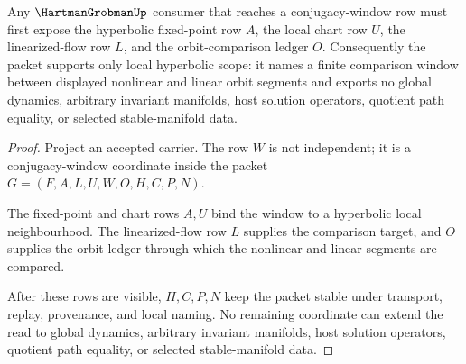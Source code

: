 \begin{theorem}
\label{thm:hartman-grobman-hyperbolic-scope}
Any $\HartmanGrobmanUp$ consumer that reaches a conjugacy-window row must first expose the hyperbolic fixed-point row $A$, the local chart row $U$, the linearized-flow row $L$, and the orbit-comparison ledger $O$. Consequently the packet supports only local hyperbolic scope: it names a finite comparison window between displayed nonlinear and linear orbit segments and exports no global dynamics, arbitrary invariant manifolds, host solution operators, quotient path equality, or selected stable-manifold data.
\end{theorem}
\begin{proof}
Project an accepted carrier. The row $W$ is not independent; it is a conjugacy-window coordinate inside the packet $G=(F,A,L,U,W,O,H,C,P,N)$.

The fixed-point and chart rows $A,U$ bind the window to a hyperbolic local neighbourhood. The linearized-flow row $L$ supplies the comparison target, and $O$ supplies the orbit ledger through which the nonlinear and linear segments are compared.

After these rows are visible, $H,C,P,N$ keep the packet stable under transport, replay, provenance, and local naming. No remaining coordinate can extend the read to global dynamics, arbitrary invariant manifolds, host solution operators, quotient path equality, or selected stable-manifold data.
\end{proof}




